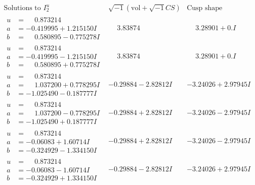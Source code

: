 \documentclass[1p]{elsarticle_modified}
\theoremstyle{definition}
\newcommand{\I}{\sqrt{-1}}
\begin{document}
$$\begin{array}{c|c|c}  
\text{Solutions to }I^u_{2}& \I (\text{vol} + \sqrt{-1}CS) & \text{Cusp shape}\\
 \hline 
\begin{aligned}
u &= \phantom{-}0.873214\phantom{ +0.000000I} \\
a &= -0.419995 + 1.215150 I \\
b &= \phantom{-}0.580895 - 0.775278 I\end{aligned}
 & \phantom{-}3.83874\phantom{ +0.000000I} & \phantom{-}3.28901 + 0. I\phantom{ +0.000000I} \\ \hline\begin{aligned}
u &= \phantom{-}0.873214\phantom{ +0.000000I} \\
a &= -0.419995 - 1.215150 I \\
b &= \phantom{-}0.580895 + 0.775278 I\end{aligned}
 & \phantom{-}3.83874\phantom{ +0.000000I} & \phantom{-}3.28901 + 0. I\phantom{ +0.000000I} \\ \hline\begin{aligned}
u &= \phantom{-}0.873214\phantom{ +0.000000I} \\
a &= \phantom{-}1.037200 + 0.778295 I \\
b &= -1.025490 - 0.187777 I\end{aligned}
 & -0.29884 - 2.82812 I & -3.24026 + 2.97945 I \\ \hline\begin{aligned}
u &= \phantom{-}0.873214\phantom{ +0.000000I} \\
a &= \phantom{-}1.037200 - 0.778295 I \\
b &= -1.025490 + 0.187777 I\end{aligned}
 & -0.29884 + 2.82812 I & -3.24026 - 2.97945 I \\ \hline\begin{aligned}
u &= \phantom{-}0.873214\phantom{ +0.000000I} \\
a &= -0.06083 + 1.60714 I \\
b &= -0.324929 - 1.334150 I\end{aligned}
 & -0.29884 + 2.82812 I & -3.24026 - 2.97945 I \\ \hline\begin{aligned}
u &= \phantom{-}0.873214\phantom{ +0.000000I} \\
a &= -0.06083 - 1.60714 I \\
b &= -0.324929 + 1.334150 I\end{aligned}
 & -0.29884 - 2.82812 I & -3.24026 + 2.97945 I \\ \hline\begin{aligned}

\end{aligned}
\end{array}$$
\end{document}
